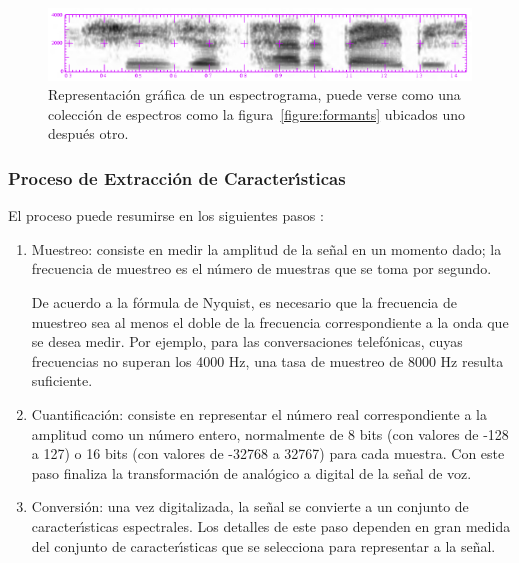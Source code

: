 \begin{figure}[H]
\centering
\includegraphics[width=0.9\linewidth]{./graphics/spectrogram.png}
\caption{Representaci\'on gr\'afica de un espectrograma, puede verse como una colecci\'on de espectros como la 
    figura~\ref{figure:formants} ubicados uno despu\'es otro. \cite{Jurafsky}}
\label{figure:spectrogram}
\end{figure}

\subsubsection{Proceso de Extracci\'on de Caracter{\'\i}sticas}
El proceso puede resumirse en los siguientes pasos \cite{Jurafsky}:

\begin{enumerate}
\item Muestreo: consiste en medir la amplitud de la se\~nal en un momento dado; la frecuencia de muestreo es el 
n\'umero de muestras que se toma por segundo. 

De acuerdo a la f\'ormula de Nyquist, es necesario que la frecuencia de muestreo sea al menos el doble de la frecuencia 
correspondiente a la onda que se desea medir. Por ejemplo, para las conversaciones telef\'onicas, cuyas frecuencias no 
superan los 4000 Hz, una tasa de muestreo de 8000 Hz resulta suficiente.

\item Cuantificaci\'on: consiste en representar el n\'umero real correspondiente a la amplitud 
como un n\'umero entero, normalmente de 8 bits (con valores de -128 a 127) o 16 bits (con valores de -32768 a 32767) para cada muestra. 
Con este paso finaliza la transformaci\'on de anal\'ogico a digital de la se\~nal de voz.

\item Conversi\'on: una vez digitalizada, la se\~nal se convierte a un conjunto de caracter{\'\i}sticas espectrales. Los detalles de este 
paso dependen en gran medida del conjunto de caracter{\'\i}sticas que se selecciona para representar a la se\~nal.

\end{enumerate}

